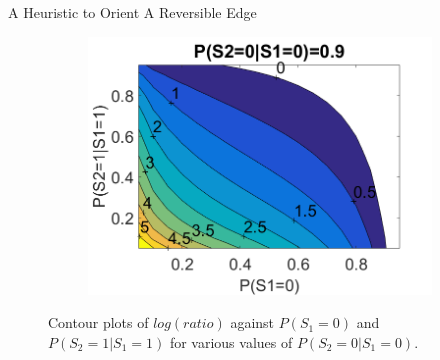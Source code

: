 \documentclass[hyperref={pdfpagelabels=false}]{beamer}
\begin{document}
\begin{frame}{A Heuristic to Orient A Reversible Edge}
\begin{figure}[!ht]
\begin{subfigure}[t]{0.32\linewidth}
			\end{subfigure}
			\begin{subfigure}[t]{0.32\linewidth}
				\centering
				\includegraphics[width=1.0\linewidth]{figures/contour3.png}
			\end{subfigure}						
			\caption{\footnotesize Contour plots of $log(ratio)$ against $P(S_1=0)$ and $P(S_2=1|S_1=1)$ for various values of $P(S_2=0|S_1=0)$.}
		\end{figure}		
\end{frame}
\end{document}
